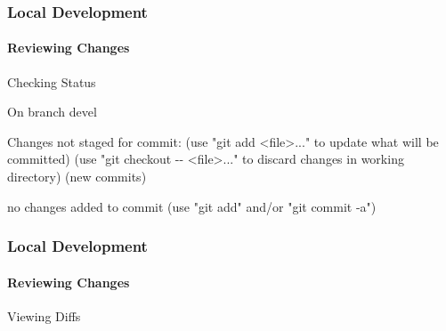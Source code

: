 \begin{frame}[fragile]
 \frametitle{Local Development}
 \framesubtitle{Reviewing Changes}

 \begin{exampleblock}{Checking Status}
  \vspace{-1em}
  \begin{semiverbatim}
On branch devel

Changes not staged for commit:
  (use "git add <file>..." to update what will be
   committed)
  (use "git checkout -{}- <file>..." to discard changes
   in working directory)
     (new commits)

no changes added to commit (use "git add" and/or "git
commit -a")
\end{semiverbatim}
 \end{exampleblock}
\end{frame}

\begin{frame}[fragile]
 \frametitle{Local Development}
 \framesubtitle{Reviewing Changes}

 \begin{exampleblock}{Viewing Diffs}
  \vspace{-1em}
  \begin{semiverbatim}
\end{semiverbatim}
 \end{exampleblock}
\end{frame}

